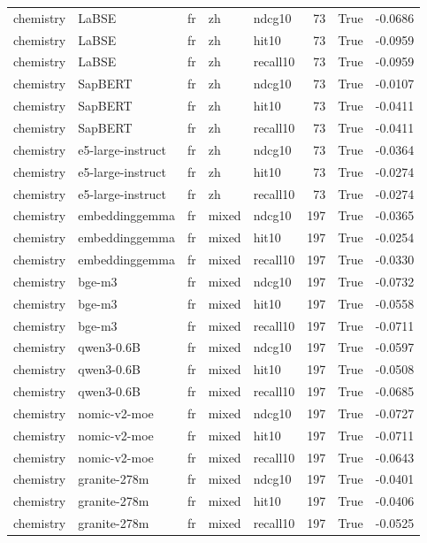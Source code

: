 \begin{tabular}{lllllrrr}
chemistry & LaBSE & fr & zh & ndcg10 & 73 & True & -0.0686 \\
chemistry & LaBSE & fr & zh & hit10 & 73 & True & -0.0959 \\
chemistry & LaBSE & fr & zh & recall10 & 73 & True & -0.0959 \\
chemistry & SapBERT & fr & zh & ndcg10 & 73 & True & -0.0107 \\
chemistry & SapBERT & fr & zh & hit10 & 73 & True & -0.0411 \\
chemistry & SapBERT & fr & zh & recall10 & 73 & True & -0.0411 \\
chemistry & e5-large-instruct & fr & zh & ndcg10 & 73 & True & -0.0364 \\
chemistry & e5-large-instruct & fr & zh & hit10 & 73 & True & -0.0274 \\
chemistry & e5-large-instruct & fr & zh & recall10 & 73 & True & -0.0274 \\
chemistry & embeddinggemma & fr & mixed & ndcg10 & 197 & True & -0.0365 \\
chemistry & embeddinggemma & fr & mixed & hit10 & 197 & True & -0.0254 \\
chemistry & embeddinggemma & fr & mixed & recall10 & 197 & True & -0.0330 \\
chemistry & bge-m3 & fr & mixed & ndcg10 & 197 & True & -0.0732 \\
chemistry & bge-m3 & fr & mixed & hit10 & 197 & True & -0.0558 \\
chemistry & bge-m3 & fr & mixed & recall10 & 197 & True & -0.0711 \\
chemistry & qwen3-0.6B & fr & mixed & ndcg10 & 197 & True & -0.0597 \\
chemistry & qwen3-0.6B & fr & mixed & hit10 & 197 & True & -0.0508 \\
chemistry & qwen3-0.6B & fr & mixed & recall10 & 197 & True & -0.0685 \\
chemistry & nomic-v2-moe & fr & mixed & ndcg10 & 197 & True & -0.0727 \\
chemistry & nomic-v2-moe & fr & mixed & hit10 & 197 & True & -0.0711 \\
chemistry & nomic-v2-moe & fr & mixed & recall10 & 197 & True & -0.0643 \\
chemistry & granite-278m & fr & mixed & ndcg10 & 197 & True & -0.0401 \\
chemistry & granite-278m & fr & mixed & hit10 & 197 & True & -0.0406 \\
chemistry & granite-278m & fr & mixed & recall10 & 197 & True & -0.0525 \\

\end{tabular}
